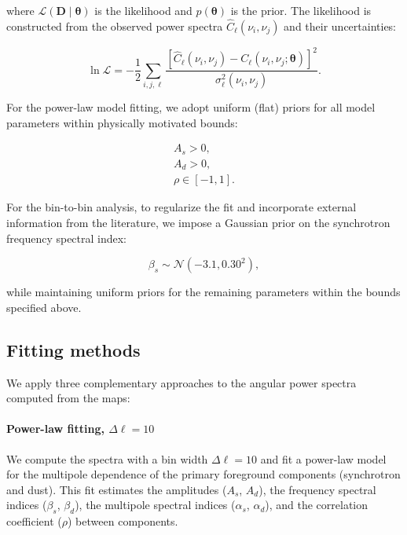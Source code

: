 where $\mathcal{L}(\mathbf{D} \mid \boldsymbol{\theta})$ is the likelihood and $p(\boldsymbol{\theta})$ is the prior. The likelihood is constructed from the observed power spectra $\hat{C}_\ell(\nu_i, \nu_j)$ and their uncertainties:

\begin{equation}
\ln \mathcal{L} = -\frac{1}{2} \sum_{i,j,\ell} \frac{[\hat{C}_\ell(\nu_i, \nu_j) - C_\ell(\nu_i, \nu_j; \boldsymbol{\theta})]^2}{\sigma^2_\ell(\nu_i, \nu_j)}.
\end{equation}

For the power-law model fitting, we adopt uniform (flat) priors for all model parameters within physically motivated bounds:

\begin{gather*}
A_s > 0, \\
A_d > 0, \\
\rho \in [-1, 1].
\end{gather*}

For the bin-to-bin analysis, to regularize the fit and incorporate external information from the literature, we impose a Gaussian prior on the synchrotron frequency spectral index:

\begin{equation}
\beta_s \sim \mathcal{N}(-3.1, 0.30^2),
\end{equation}

while maintaining uniform priors for the remaining parameters within the bounds specified above.

\subsection{Fitting methods}
\label{sec:fitting_methods}

We apply three complementary approaches to the angular power spectra computed from the maps:

\paragraph{Power-law fitting, $\Delta\ell = 10$}
We compute the spectra with a bin width $\Delta\ell = 10$ and fit a power-law model for the multipole dependence of the primary foreground components (synchrotron and dust). This fit estimates the amplitudes ($A_s$, $A_d$), the frequency spectral indices ($\beta_s$, $\beta_d$), the multipole spectral indices ($\alpha_s$, $\alpha_d$), and the correlation coefficient ($\rho$) between components.

